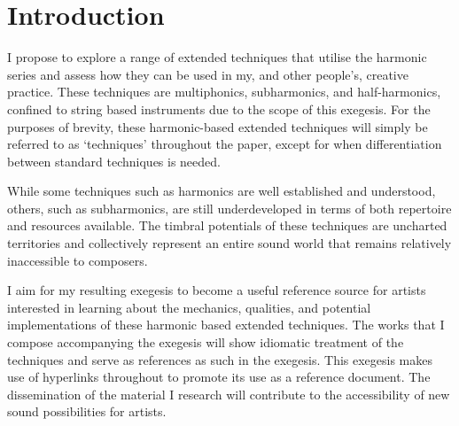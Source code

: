 \section{Introduction}


\doublespace{}

I propose to explore a range of extended techniques that utilise the harmonic series and assess how they can be used in my, and other people's, creative practice. 
These techniques are multiphonics, subharmonics, and half-harmonics, confined to string based instruments due to the scope of this exegesis.
For the purposes of brevity, these harmonic-based extended techniques will simply be referred to as `techniques' throughout the paper, except for when differentiation between standard techniques is needed.

While some techniques such as harmonics are well established and understood, others, such as subharmonics, are still underdeveloped in terms of both repertoire and resources available. 
The timbral potentials of these techniques are uncharted territories and collectively represent an entire sound world that remains relatively inaccessible to composers.


I aim for my resulting exegesis to become a useful reference source for artists interested in learning about the mechanics, qualities, and potential implementations of these harmonic based extended techniques. 
The works that I compose accompanying the exegesis will show idiomatic treatment of the techniques and serve as references as such in the exegesis.
This exegesis makes use of hyperlinks throughout to promote its use as a reference document. 
The dissemination of the material I research will contribute to the accessibility of new sound possibilities for artists.


